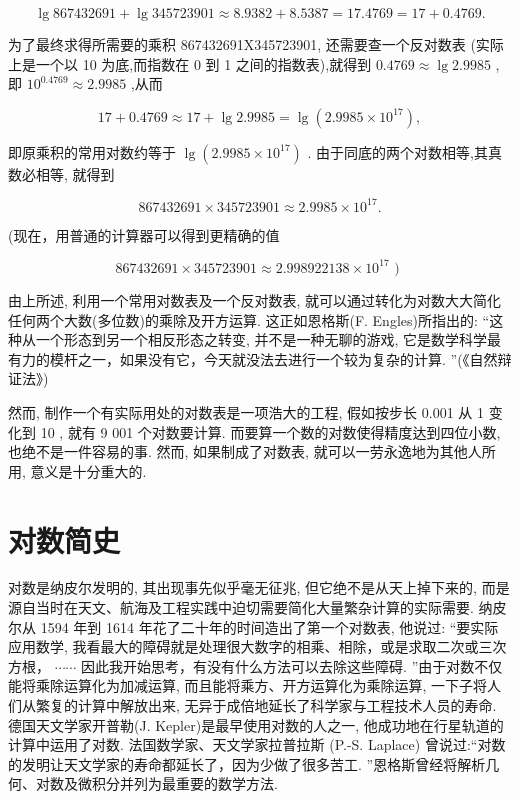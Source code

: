 \documentclass[10pt]{article}
\begin{document}
\[
\lg {867432691} + \lg {345723901} \approx  {8.9382} + {8.5387} = {17.4769} = {17} + {0.4769}.
\]

为了最终求得所需要的乘积 867432691X345723901, 还需要查一个反对数表 (实际上是一个以 10 为底,而指数在 0 到 1 之间的指数表),就得到 \({0.4769} \approx  \lg {2.9985}\) ,即 \({10}^{0.4769} \approx  {2.9985}\) ,从而

\[
{17} + {0.4769} \approx  {17} + \lg {2.9985} = \lg \left( {{2.9985} \times  {10}^{17}}\right) ,
\]

即原乘积的常用对数约等于 \(\lg \left( {{2.9985} \times  {10}^{17}}\right)\) . 由于同底的两个对数相等,其真数必相等, 就得到

\[
{867432691} \times  {345723901} \approx  {2.9985} \times  {10}^{17}.
\]

(现在，用普通的计算器可以得到更精确的值

\[
{867432691} \times  {345723901} \approx  {2.998922138} \times  {10}^{17}\text{ ) }
\]

由上所述, 利用一个常用对数表及一个反对数表, 就可以通过转化为对数大大简化任何两个大数(多位数)的乘除及开方运算. 这正如恩格斯(F. Engles)所指出的: “这种从一个形态到另一个相反形态之转变, 并不是一种无聊的游戏, 它是数学科学最有力的模杆之一，如果没有它，今天就没法去进行一个较为复杂的计算. ”(《自然辩证法》)

然而, 制作一个有实际用处的对数表是一项浩大的工程, 假如按步长 0.001 从 1 变化到 10 , 就有 9 001 个对数要计算. 而要算一个数的对数使得精度达到四位小数, 也绝不是一件容易的事. 然而, 如果制成了对数表, 就可以一劳永逸地为其他人所用, 意义是十分重大的.

\section*{对数简史}

对数是纳皮尔发明的, 其出现事先似乎毫无征兆, 但它绝不是从天上掉下来的, 而是源自当时在天文、航海及工程实践中迫切需要简化大量繁杂计算的实际需要. 纳皮尔从 1594 年到 1614 年花了二十年的时间造出了第一个对数表, 他说过: “要实际应用数学, 我看最大的障碍就是处理很大数字的相乘、相除，或是求取二次或三次方根， \(\cdots \cdots\) 因此我开始思考，有没有什么方法可以去除这些障碍. ”由于对数不仅能将乘除运算化为加减运算, 而且能将乘方、开方运算化为乘除运算, 一下子将人们从繁复的计算中解放出来, 无异于成倍地延长了科学家与工程技术人员的寿命. 德国天文学家开普勒(J. Kepler)是最早使用对数的人之一, 他成功地在行星轨道的计算中运用了对数. 法国数学家、天文学家拉普拉斯 (P.-S. Laplace) 曾说过:“对数的发明让天文学家的寿命都延长了，因为少做了很多苦工. ”恩格斯曾经将解析几何、对数及微积分并列为最重要的数学方法.
\end{document}
